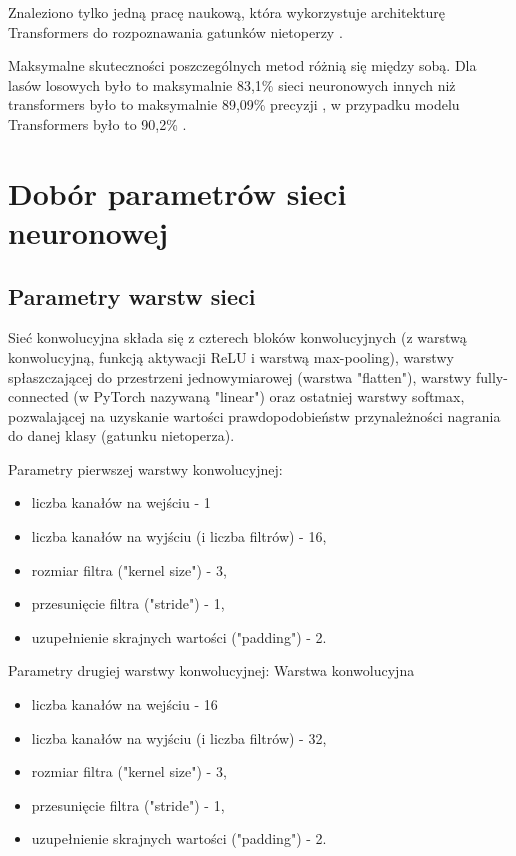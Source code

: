 \documentclass{sprz}
\begin{document}
Znaleziono tylko jedną pracę naukową, która wykorzystuje architekturę Transformers do rozpoznawania gatunków nietoperzy \cite{bats-transformers}.

Maksymalne skuteczności poszczególnych metod różnią się między sobą. Dla lasów losowych było to maksymalnie 83,1\% \cite{bats-id-randomforest} sieci neuronowych innych niż transformers było to maksymalnie 89,09\% precyzji \cite{bats-id-dl}, w przypadku modelu Transformers było to 90,2\% \cite{bats-transformers}.

\section{Dobór parametrów sieci neuronowej}

\subsection{Parametry warstw sieci}
Sieć konwolucyjna składa się z czterech bloków konwolucyjnych (z warstwą konwolucyjną, funkcją aktywacji ReLU i warstwą max-pooling), warstwy spłaszczającej do przestrzeni jednowymiarowej (warstwa "flatten"), warstwy fully-connected (w PyTorch nazywaną "linear") oraz ostatniej warstwy softmax, pozwalającej na uzyskanie wartości prawdopodobieństw przynależności nagrania do danej klasy (gatunku nietoperza).

Parametry pierwszej warstwy konwolucyjnej:
\begin{itemize}
  \item{liczba kanałów na wejściu - 1}
  \item{liczba kanałów na wyjściu (i liczba filtrów) - 16,}
  \item{rozmiar filtra ("kernel size") - 3,}
  \item {przesunięcie filtra ("stride") - 1,}
  \item{uzupełnienie skrajnych wartości ("padding") - 2.}
\end{itemize}


Parametry drugiej warstwy konwolucyjnej:
Warstwa konwolucyjna
\begin{itemize}
  \item{liczba kanałów na wejściu - 16}
  \item{liczba kanałów na wyjściu (i liczba filtrów) - 32,}
  \item{rozmiar filtra ("kernel size") - 3,}
  \item {przesunięcie filtra ("stride") - 1,}
  \item{uzupełnienie skrajnych wartości ("padding") - 2.}
\end{itemize}
\end{document}
